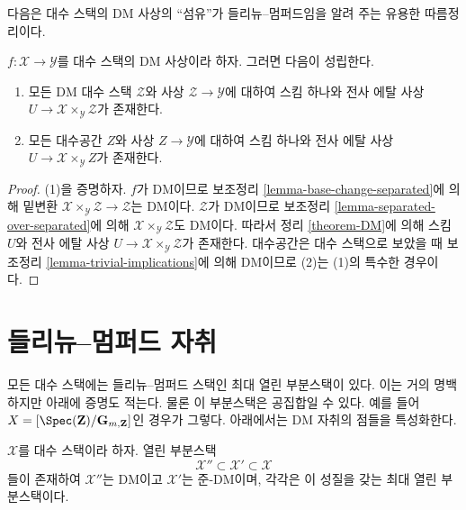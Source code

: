 \noindent
다음은 대수 스택의 DM 사상의 ``섬유''가 들리뉴–멈퍼드임을 알려 주는
유용한 따름정리이다.

\begin{lemma}
\label{lemma-DM}
$f : \mathcal{X} \to \mathcal{Y}$를 대수 스택의 DM 사상이라 하자.
그러면 다음이 성립한다.
\begin{enumerate}
\item 모든 DM 대수 스택 $\mathcal{Z}$와 사상
$\mathcal{Z} \to \mathcal{Y}$에 대하여 스킴 하나와 전사 에탈 사상
$U \to \mathcal{X} \times_\mathcal{Y} \mathcal{Z}$가 존재한다.%
\item 모든 대수공간 $Z$와 사상 $Z \to \mathcal{Y}$에 대하여 스킴
하나와 전사 에탈 사상
$U \to \mathcal{X} \times_\mathcal{Y} Z$가 존재한다.%
\end{enumerate}
\end{lemma}

\begin{proof}
(1)을 증명하자. $f$가 DM이므로 보조정리
\ref{lemma-base-change-separated}에 의해 밑변환
$\mathcal{X} \times_\mathcal{Y} \mathcal{Z} \to \mathcal{Z}$는 DM이다.
$\mathcal{Z}$가 DM이므로 보조정리 \ref{lemma-separated-over-separated}에
의해 $\mathcal{X} \times_\mathcal{Y} \mathcal{Z}$도 DM이다. 따라서
정리 \ref{theorem-DM}에 의해 스킴 $U$와 전사 에탈 사상
$U \to \mathcal{X} \times_\mathcal{Y} \mathcal{Z}$가 존재한다.
대수공간은 대수 스택으로 보았을 때 보조정리
\ref{lemma-trivial-implications}에 의해 DM이므로 (2)는 (1)의 특수한
경우이다.
\end{proof}






\section{들리뉴–멈퍼드 자취}
\label{section-DM}

\noindent
모든 대수 스택에는 들리뉴–멈퍼드 스택인 최대 열린 부분스택이 있다.
이는 거의 명백하지만 아래에 증명도 적는다. 물론 이 부분스택은 공집합일
수 있다. 예를 들어 $X = [\Spec(\mathbf{Z})/\mathbf{G}_{m, \mathbf{Z}}]$인
경우가 그렇다. 아래에서는 DM 자취의 점들을 특성화한다.

\begin{lemma}
\label{lemma-open-DM-locus}
$\mathcal{X}$를 대수 스택이라 하자. 열린 부분스택
$$
\mathcal{X}'' \subset \mathcal{X}' \subset \mathcal{X}
$$
들이 존재하여 $\mathcal{X}''$는 DM이고 $\mathcal{X}'$는 준-DM이며,
각각은 이 성질을 갖는 최대 열린 부분스택이다.
\end{lemma}

